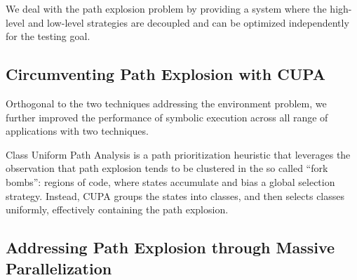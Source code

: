We deal with the path explosion problem by providing a system where the high-level and low-level strategies are decoupled and can be optimized independently for the testing goal.

\subsection{Circumventing Path Explosion with CUPA}

Orthogonal to the two techniques addressing the environment problem, we further improved the performance of symbolic execution across all range of applications with two techniques.

Class Uniform Path Analysis is a path prioritization heuristic that leverages the observation that path explosion tends to be clustered in the so called ``fork bombs'':  regions of code, where states accumulate and bias a global selection strategy.  Instead, CUPA groups the states into classes, and then selects classes uniformly, effectively containing the path explosion.

\subsection{Addressing Path Explosion through Massive Parallelization}



